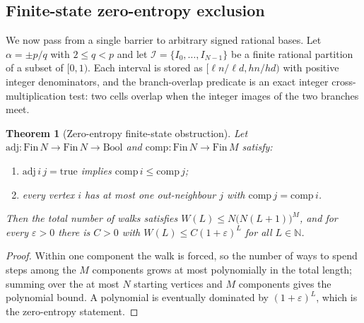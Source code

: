 \documentclass[11pt,a4paper]{article}
\newtheorem{theorem}{Theorem}[section]
\theoremstyle{remark}
\newcommand{\N}{\mathbb{N}}
\begin{document}
\subsection{Finite-state zero-entropy exclusion}

We now pass from a single barrier to arbitrary signed rational bases. Let $\alpha = \pm p/q$ with $2 \le q < p$ and let $\mathcal{I} = \{I_{0}, \dots, I_{N-1}\}$ be a finite rational partition of a subset of $[0,1)$. Each interval is stored as $[\ell n/\ell d, h n/h d)$ with positive integer denominators, and the branch-overlap predicate is an exact integer cross-multiplication test: two cells overlap when the integer images of the two branches meet.

\begin{theorem}[Zero-entropy finite-state obstruction]
\label{thm:ze}
Let $\mathrm{adj} : \mathrm{Fin}\,N \to \mathrm{Fin}\,N \to \mathrm{Bool}$ and $\mathrm{comp} : \mathrm{Fin}\,N \to \mathrm{Fin}\,M$ satisfy:
\begin{enumerate}[leftmargin=1.5em]
  \item $\mathrm{adj}\,i\,j = \mathrm{true}$ implies $\mathrm{comp}\,i \le \mathrm{comp}\,j$;
  \item every vertex $i$ has at most one out-neighbour $j$ with $\mathrm{comp}\,j = \mathrm{comp}\,i$.
\end{enumerate}
Then the total number of walks satisfies $W(L) \le N\bigl(N(L+1)\bigr)^{M}$, and for every $\varepsilon > 0$ there is $C > 0$ with $W(L) \le C (1+\varepsilon)^{L}$ for all $L \in \N$.
\end{theorem}

\begin{proof}
Within one component the walk is forced, so the number of ways to spend steps among the $M$ components grows at most polynomially in the total length; summing over the at most $N$ starting vertices and $M$ components gives the polynomial bound. A polynomial is eventually dominated by $(1+\varepsilon)^{L}$, which is the zero-entropy statement.
\end{proof}
\end{document}
